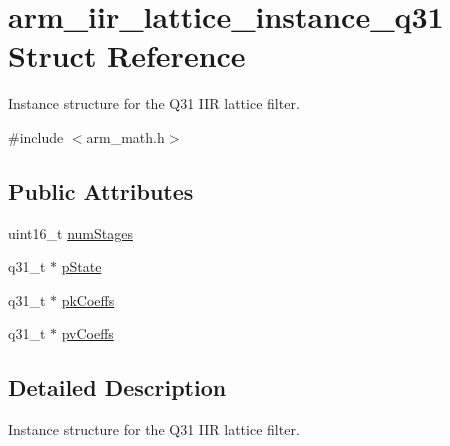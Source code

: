 \hypertarget{structarm__iir__lattice__instance__q31}{\section{arm\-\_\-iir\-\_\-lattice\-\_\-instance\-\_\-q31 Struct Reference}
\label{structarm__iir__lattice__instance__q31}
}


Instance structure for the Q31 I\-I\-R lattice filter.  




{\ttfamily \#include $<$arm\-\_\-math.\-h$>$}

\subsection*{Public Attributes}
\begin{DoxyCompactItemize}
\item 
uint16\-\_\-t \hyperlink{structarm__iir__lattice__instance__q31_a9df4570ed28c50fd9193ab654ff236ad}{num\-Stages}
\item 
q31\-\_\-t $\ast$ \hyperlink{structarm__iir__lattice__instance__q31_a941282745effd26a889fbfadf4b95e6a}{p\-State}
\item 
q31\-\_\-t $\ast$ \hyperlink{structarm__iir__lattice__instance__q31_a1d30aa16aac7722936ea9dee59211863}{pk\-Coeffs}
\item 
q31\-\_\-t $\ast$ \hyperlink{structarm__iir__lattice__instance__q31_a04507e2b982b1dfa97b7b55752dea6b9}{pv\-Coeffs}
\end{DoxyCompactItemize}


\subsection{Detailed Description}
Instance structure for the Q31 I\-I\-R lattice filter. 

